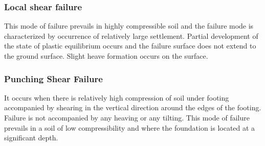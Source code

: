 \subsubsection{Local shear failure}
This mode of failure prevails in highly compressible soil and the failure mode is characterized by occurrence of relatively large settlement. Partial development of the state of plastic equilibrium occurs and the failure surface does not extend to the ground surface. Slight heave formation occurs on the surface.
\subsubsection{Punching Shear Failure}
It occurs when there is relatively high compression of soil under footing accompanied by shearing in the vertical direction around the edges of the footing. Failure is not accompanied by any heaving or any tilting. This mode of failure prevails in a soil of low compressibility and where the foundation is located at a significant depth.

